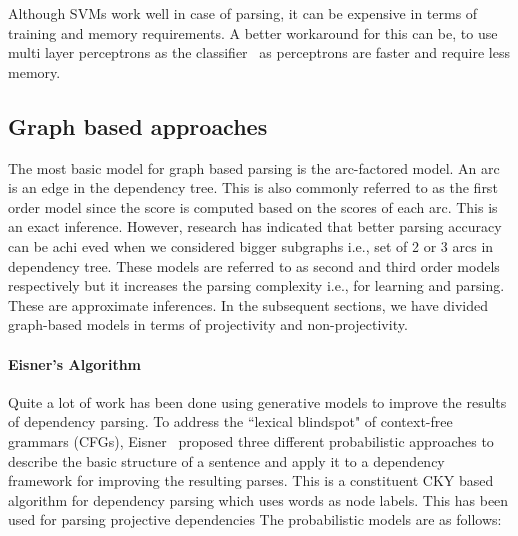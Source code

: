 Although SVMs work well in case of parsing, it can be expensive in terms of training and memory requirements. A better workaround for this can be, to use multi layer perceptrons as the classifier~\cite{attardi2009accurate} as perceptrons are faster and require less memory.  









\subsection{Graph based approaches}

The most basic model for graph based parsing is the arc-factored model. An arc is an edge in the dependency tree. This is also commonly referred to as the first order model since the score is computed based on the scores of each arc. This is an exact inference. However, research has indicated that better parsing accuracy can be achi  eved when we considered bigger subgraphs i.e., set of 2 or 3 arcs in dependency tree. These models are referred to as second and third order models respectively but it increases the parsing complexity i.e., for learning and parsing. These are approximate inferences. In the subsequent sections, we have divided graph-based models in terms of projectivity and non-projectivity. 



\paragraph*{Eisner's Algorithm}
Quite a lot of work has been done using generative models to improve the results of dependency parsing. To address the ``lexical blindspot" of context-free grammars (CFGs), Eisner~\cite{eisner1996three} proposed three different probabilistic approaches to describe the basic structure of a sentence and apply it to a dependency framework for improving the resulting parses. This is a constituent CKY based algorithm for dependency parsing which uses words as node labels. This has been used for parsing projective dependencies The probabilistic models are as follows:

